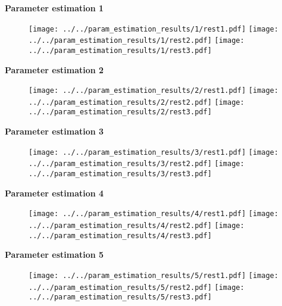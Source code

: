 \documentclass{article}
\begin{document}
\thispagestyle{empty}
\pagestyle{empty}

\hspace{1in} \bf{Parameter estimation 1}

\begin{figure}[!h]
  \texttt{[image: ../../param\_estimation\_results/1/rest1.pdf]}
  \texttt{[image: ../../param\_estimation\_results/1/rest2.pdf]}
  \texttt{[image: ../../param\_estimation\_results/1/rest3.pdf]}
\end{figure}

\newpage

\hspace{1in} \bf{Parameter estimation 2}

\begin{figure}[!h]
  \texttt{[image: ../../param\_estimation\_results/2/rest1.pdf]}
  \texttt{[image: ../../param\_estimation\_results/2/rest2.pdf]}
  \texttt{[image: ../../param\_estimation\_results/2/rest3.pdf]}
\end{figure}

\newpage

\hspace{1in} \bf{Parameter estimation 3}

\begin{figure}[!h]
  \texttt{[image: ../../param\_estimation\_results/3/rest1.pdf]}
  \texttt{[image: ../../param\_estimation\_results/3/rest2.pdf]}
  \texttt{[image: ../../param\_estimation\_results/3/rest3.pdf]}
\end{figure}

\newpage

\hspace{1in} \bf{Parameter estimation 4}

\begin{figure}[!h]
  \texttt{[image: ../../param\_estimation\_results/4/rest1.pdf]}
  \texttt{[image: ../../param\_estimation\_results/4/rest2.pdf]}
  \texttt{[image: ../../param\_estimation\_results/4/rest3.pdf]}
\end{figure}

\newpage

\hspace{1in} \bf{Parameter estimation 5}

\begin{figure}[!h]
  \texttt{[image: ../../param\_estimation\_results/5/rest1.pdf]}
  \texttt{[image: ../../param\_estimation\_results/5/rest2.pdf]}
  \texttt{[image: ../../param\_estimation\_results/5/rest3.pdf]}
\end{figure}
\end{document}
